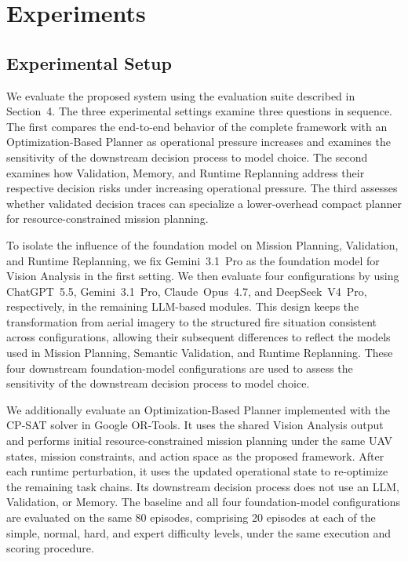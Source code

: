 \section{Experiments}

\subsection{Experimental Setup}

We evaluate the proposed system using the evaluation suite described in
Section~4. The three experimental settings examine three questions in sequence.
The first compares the end-to-end behavior of the complete framework with an
Optimization-Based Planner as operational pressure increases and examines the
sensitivity of the downstream decision process to model choice. The second
examines how Validation, Memory, and Runtime Replanning address their respective
decision risks under increasing operational pressure. The third assesses
whether validated decision traces can specialize a lower-overhead compact
planner for resource-constrained mission planning.

To isolate the influence of the foundation model on Mission Planning,
Validation, and Runtime Replanning, we fix Gemini~3.1~Pro as the foundation
model for Vision Analysis in the first setting. We then evaluate four
configurations by using ChatGPT~5.5, Gemini~3.1~Pro, Claude~Opus~4.7, and
DeepSeek~V4~Pro, respectively, in the remaining LLM-based modules. This design
keeps the transformation from aerial imagery to the structured fire situation
consistent across configurations, allowing their subsequent differences to
reflect the models used in Mission Planning, Semantic Validation, and Runtime
Replanning. These four downstream foundation-model configurations are used to
assess the sensitivity of the downstream decision process to model choice.

We additionally evaluate an Optimization-Based Planner implemented with the
CP-SAT solver in Google OR-Tools. It uses the shared Vision Analysis output and
performs initial resource-constrained mission planning under the same UAV
states, mission constraints, and action space as the proposed framework. After
each runtime perturbation, it uses the updated operational state to re-optimize
the remaining task chains. Its downstream decision process does not use an LLM,
Validation, or Memory. The baseline and all four foundation-model
configurations are evaluated on the same 80 episodes, comprising 20 episodes at
each of the simple, normal, hard, and expert difficulty levels, under the same
execution and scoring procedure.

